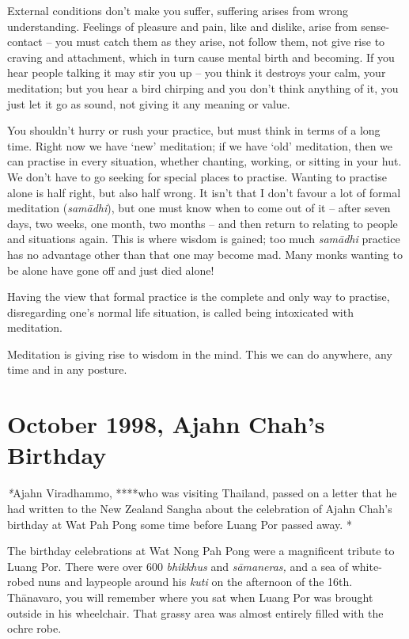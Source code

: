 External conditions don't make you suffer, suffering arises from wrong
understanding. Feelings of pleasure and pain, like and dislike, arise
from sense-contact -- you must catch them as they arise, not follow
them, not give rise to craving and attachment, which in turn cause
mental birth and becoming. If you hear people talking it may stir you up
-- you think it destroys your calm, your meditation; but you hear a bird
chirping and you don't think anything of it, you just let it go as
sound, not giving it any meaning or value.

You shouldn't hurry or rush your practice, but must think in terms of a
long time. Right now we have `new' meditation; if we have `old'
meditation, then we can practise in every situation, whether chanting,
working, or sitting in your hut. We don't have to go seeking for special
places to practise. Wanting to practise alone is half right, but also
half wrong. It isn't that I don't favour a lot of formal meditation
(\emph{samādhi}), but one must know when to come out of it -- after
seven days, two weeks, one month, two months -- and then return to
relating to people and situations again. This is where wisdom is gained;
too much \emph{samādhi} practice has no advantage other than that one
may become mad. Many monks wanting to be alone have gone off and just
died alone!

Having the view that formal practice is the complete and only way to
practise, disregarding one's normal life situation, is called being
intoxicated with meditation.

Meditation is giving rise to wisdom in the mind. This we can do
anywhere, any time and in any posture.

\chapter{October 1998, Ajahn Chah's Birthday}

\emph{*}Ajahn Viradhammo, ****who was visiting Thailand, passed on a
letter that he had written to the New Zealand Sangha about the
celebration of Ajahn Chah's birthday at Wat Pah Pong some time before
Luang Por passed away. *

The birthday celebrations at Wat Nong Pah Pong were a magnificent
tribute to Luang Por. There were over 600 \emph{bhikkhus} and
\emph{sāmaneras,} and a sea of white-robed nuns and laypeople around his
\emph{kuti} on the afternoon of the 16th. Thānavaro, you will remember
where you sat when Luang Por was brought outside in his wheelchair. That
grassy area was almost entirely filled with the ochre robe.


